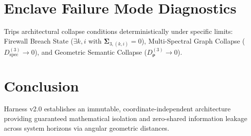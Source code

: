 \documentclass[11pt]{article}
\begin{document}
\section{Enclave Failure Mode Diagnostics}
Trips architectural collapse conditions deterministically under specific limits: Firewall Breach State ($\exists k, i$ with $\mathbf{\Sigma}_{3, (k,i)} = 0$), Multi-Spectral Graph Collapse ($D_{\mathrm{spec}}^{(3)} \to 0$), and Geometric Semantic Collapse ($D_{\mathbf{\rho}}^{(3)} \to 0$).

\section{Conclusion}
Harness v2.0 establishes an immutable, coordinate-independent architecture providing guaranteed mathematical isolation and zero-shared information leakage across system horizons via angular geometric distances.
\end{document}

